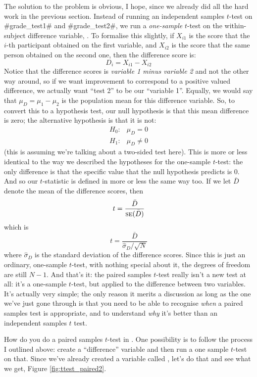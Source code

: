 The solution to the problem is obvious, I hope, since we already did all the hard work in the previous section. Instead of running an independent samples $t$-test on \rtextverb#grade_test1# and \rtextverb#grade_test2#, we run a {\it one-sample} $t$-test on the within-subject difference variable, . To formalise this slightly, if $X_{i1}$ is the score that the $i$-th participant obtained on the first variable, and $X_{i2}$ is the score that the same person obtained on the second one, then the difference score is:
$$
D_{i} = X_{i1} - X_{i2} 
$$
Notice that the difference scores is {\it variable 1 minus variable 2} and not the other way around, so if we want improvement to correspond to a positive valued difference, we actually want ``test 2'' to be our ``variable 1''. Equally, we would say that $\mu_D = \mu_1 - \mu_2$ is the population mean for this difference variable. So, to convert this to a hypothesis test, our null hypothesis is that this mean difference is zero; the alternative hypothesis is that it is not:
$$
\begin{array}{ll}
H_0: & \mu_D = 0  \\
H_1: & \mu_D \neq 0
\end{array}
$$
(this is assuming we're talking about a two-sided test here). This is more or less identical to the way we described the hypotheses for the one-sample $t$-test: the only difference is that the specific value that the null hypothesis predicts is 0. And so our $t$-statistic is defined in more or less the same way too. If we let $\bar{D}$ denote the mean of the difference scores, then 
$$
t = \frac{\bar{D}}{\mbox{\textsc{se}}(\bar{D})}
$$
which is 
$$
t = \frac{\bar{D}}{\hat\sigma_D / \sqrt{N}}
$$
where $\hat\sigma_D$ is the standard deviation of the difference scores. Since this is just an ordinary, one-sample $t$-test, with nothing special about it, the degrees of freedom are still $N-1$. And that's it: the paired samples $t$-test really isn't a new test at all: it's a one-sample $t$-test, but applied to the difference between two variables. It's actually very simple; the only reason it merits a discussion as long as the one we've just gone through is that you need to be able to recognise {\it when} a paired samples test is appropriate, and to understand {\it why} it's better than an independent samples $t$ test. 



How do you do a paired samples $t$-test in \R. One possibility is to follow the process I outlined above: create a ``difference'' variable and then run a one sample $t$-test on that. Since we've already created a variable called , let's do that and see what we get, Figure \ref{fig:ttest_paired2}.

